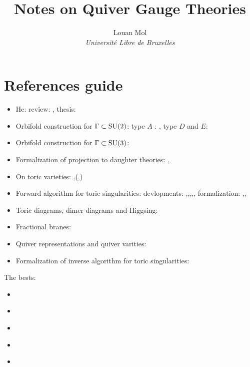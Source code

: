 \documentclass[a4paper,10pt]{article}
\title{\textbf{Notes on Quiver Gauge Theories}}
\author{Louan Mol\\ \textit{Université Libre de Bruxelles}}
\date{}
\begin{document}

  
\pagebreak

\tableofcontents

\pagebreak

\nocite{*}









\pagebreak
\appendix



\section{References guide}

\begin{itemize}
    \item He: review: \cite{he2004lectures}, thesis: \cite{masterHe}
    \item Orbifold construction for $\Gamma\subset\text{SU}(2)$: type $A$ : \cite{douglas1996dbranes}, type $D$ and $E$: \cite{PhysRevD.55.6382}
    \item Orbifold construction for $\Gamma\subset\text{SU}(3)$:\cite{Hanany_1999}
    \item Formalization of projection to daughter theories: \cite{vafa1998},\cite{silervstein1998}
    \item On toric varieties: \cite{cox2011toric},\cite{torigeomandCY}(\cite{fulton1993introduction},\cite{oda1988convex})
    \item Forward algorithm  for toric singularities: devlopments: \cite{FA1},\cite{FA2},\cite{FA3},\cite{FA4},\cite{FA5}, formalization: \cite{FA6},\cite{FA7},\cite{FA8}
    \item Toric diagrams, dimer diagrams and Higgsing: \cite{Argurio_20081}
    \item Fractional branes: \cite{Argurio_20082}
    \item Quiver representations and quiver varities: \cite{kirillov2016quiver}
    \item Formalization of inverse algorithm for toric singularities: \cite{Feng_2001}
\end{itemize}

The bests:
\begin{itemize}
    \item \cite{bertolinisusy}
    \item \cite{DbranespartI,DbranespartII}
    \item \cite{he2004lectures}
    \item \cite{brion}
    \item \cite{torigeomandCY}
\end{itemize}

\pagebreak

\listoftodos

\pagebreak

\printbibliography
\end{document}
